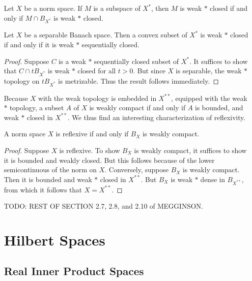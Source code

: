 \begin{corollary}
    Let $X$ be a norm space. If $M$ is a subspace of $X^*$, then $M$ is weak $*$ closed if and only if $M \cap B_{X^*}$ is weak $*$ closed.
\end{corollary}

\begin{corollary}
    Let $X$ be a separable Banach space. Then a convex subset of $X^*$ is weak $*$ closed if and only if it is weak $*$ sequentially closed.
\end{corollary}
\begin{proof}
    Suppose $C$ is a weak $*$ sequentially closed subset of $X^*$. It suffices to show that $C \cap t B_{X^*}$ is weak $*$ closed for all $t > 0$. But since $X$ is separable, the weak $*$ topology on $t B_{X^*}$ is metrizable. Thus the result follows immediately.
\end{proof}

Because $X$ with the weak topology is embedded in $X^{**}$, equipped with the weak $*$ topology, a subset $A$ of $X$ is weakly compact if and only if $A$ is bounded, and weak $*$ closed in $X^{**}$. We thus find an interesting characterization of reflexivity.

\begin{theorem}
    A norm space $X$ is reflexive if and only if $B_X$ is weakly compact.
\end{theorem}
\begin{proof}
    Suppose $X$ is reflexive. To show $B_X$ is weakly compact, it suffices to show it is bounded and weakly closed. But this follows because of the lower semicontinuous of the norm on $X$. Conversely, suppose $B_X$ is weakly compact. Then it is bounded and weak $*$ closed in $X^{**}$. But $B_X$ is weak $*$ dense in $B_{X^{**}}$, from which it follows that $X = X^{**}$.
\end{proof}

TODO: REST OF SECTION 2.7, 2.8, and 2.10 of MEGGINSON.









\chapter{Hilbert Spaces}

\section{Real Inner Product Spaces}

